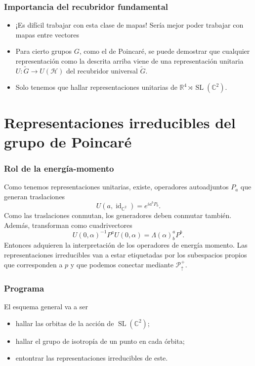 \documentclass{beamer}
\DeclareMathOperator{\SL}{SL}
\DeclareMathOperator{\id}{id}
\begin{document}
\begin{frame}
\frametitle{Importancia del recubridor fundamental}
\begin{itemize}
\item ¡Es difícil trabajar con esta clase de mapas! Sería mejor poder trabajar con mapas entre vectores
\item Para cierto grupos $G$, como el de Poincaré, se puede demostrar que cualquier representación como la descrita arriba viene de una representación unitaria $U:\tilde{G}\rightarrow U(\mathcal{H})$ del recubridor universal $\tilde{G}$.
\item Solo tenemos que hallar representaciones unitarias de $\mathbb{R}^4\rtimes\SL(\mathbb{C}^2)$.
\end{itemize}
\end{frame}

\section{Representaciones irreducibles del grupo de Poincaré}

\begin{frame}
\frametitle{Rol de la energía-momento}
Como tenemos representaciones unitarias, existe, operadores autoadjuntos $P_a$ que generan traslaciones
\begin{equation}
U(a,\id_{\mathbb{C}^2})=e^{ia^bP_b}.
\end{equation}
Como las traslaciones conmutan, los generadores deben conmutar también. Además, transforman como cuadrivectores
\begin{equation}
U(0,\alpha)^{-1}P^a U(0,\alpha) = \Lambda(\alpha)^a_b P^b.
\end{equation}
Entonces adquieren la interpretación de los operadores de energía momento. Las representaciones irreducibles van a estar etiquetadas por los subespacios propios que corresponden a $p$ y que podemos conectar mediante $\mathcal{P}^+_\uparrow$.
\end{frame}

\begin{frame}
\frametitle{Programa}
El esquema general va a ser\cite{Sternberg1994}
\begin{itemize}
\item hallar las orbitas de la acción de $\SL(\mathbb{C}^2)$;
\item hallar el grupo de isotropía de un punto en cada órbita;
\item entontrar las representaciones irreducibles de este.
\end{itemize}
\end{frame}
\end{document}
